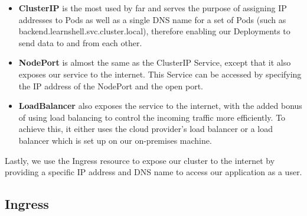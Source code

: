 \documentclass[thesis=B,english]{FITthesis}[2019/12/23]
\begin{document}
\begin{itemize}
  \setlength\itemsep{0em}
  \item \textbf{ClusterIP} is the most used by far and serves the purpose of assigning IP addresses to Pods as well as a single DNS name for a set of Pods (such as backend.learnshell.svc.cluster.local), therefore enabling our Deployments to send data to and from each other.
  \item \textbf{NodePort} is almost the same as the ClusterIP Service, except that it also exposes our service to the internet. This Service can be accessed by specifying the IP address of the NodePort and the open port.
  \item \textbf{LoadBalancer} also exposes the service to the internet, with the added bonus of using load balancing to control the incoming traffic more efficiently. To achieve this, it either uses the cloud provider's load balancer or a load balancer which is set up on our on-premises machine.
\end{itemize}

Lastly, we use the Ingress resource to expose our cluster to the internet by providing a specific IP address and DNS name to access our application as a user. 

\subsection{Ingress}
\end{document}
